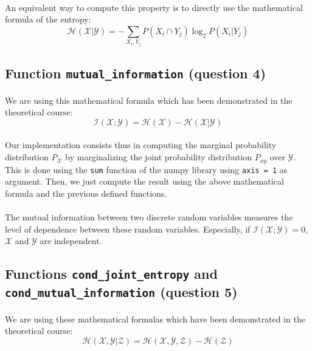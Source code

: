 \documentclass[a4paper, 11pt, oneside]{article}
\begin{document}
\paragraph{}An equivalent way to compute this property is to directly use the mathematical formula of the entropy:
$$ \mathcal{H}(\mathcal{X} | \mathcal{Y}) = - \sum_{X_i, Y_j} P(X_i \cap Y_j) \log_2{P(X_i | Y_j)} $$

\subsection{Function \texttt{mutual\_information} (question 4)}

\paragraph{}We are using this mathematical formula which has been demonstrated in the theoretical course: 
$$ \mathcal{I}(\mathcal{X}; \mathcal{Y}) = \mathcal{H}(\mathcal{X}) - \mathcal{H}(\mathcal{X}| \mathcal{Y})$$

\paragraph{}Our implementation consists thus in computing the marginal probability distribution $P_\mathcal{X}$ by marginalizing the joint probability distribution $P_{xy}$ over $\mathcal{Y}$. This is done using the \texttt{sum} function of the numpy library using \texttt{axis = 1} as argument. Then, we just compute the result using the above mathematical formula and the previous defined functions.

\paragraph{}The mutual information between two discrete random variables measures the level of dependence between these random variables. Especially, if $\mathcal{I}(\mathcal{X}; \mathcal{Y}) = 0$, $\mathcal{X}$ and $\mathcal{Y}$ are independent.

\subsection{Functions \texttt{cond\_joint\_entropy} and \texttt{cond\_mutual\_information} (question 5)}

\paragraph{}We are using these mathematical formulas which have been demonstrated in the theoretical course: 
$$ \mathcal{H}(\mathcal{X}, \mathcal{Y} | \mathcal{Z}) = \mathcal{H}(\mathcal{X}, \mathcal{Y}, \mathcal{Z}) - \mathcal{H}(\mathcal{Z})$$
\end{document}
